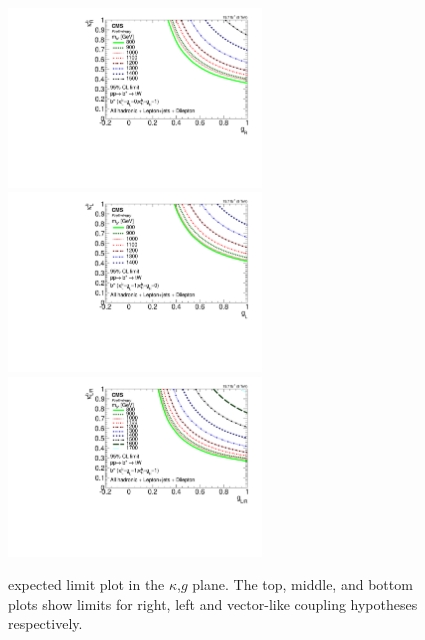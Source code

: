 \begin{figure}[htcb]
\centering
\includegraphics[width=0.6\textwidth]{AN-14-049/figs/bayesian_expected_hadronic_semileptonic_right_2Dlimit_plot.pdf}\\
\includegraphics[width=0.6\textwidth]{AN-14-049/figs/bayesian_expected_hadronic_semileptonic_left_2Dlimit_plot.pdf}\\
\includegraphics[width=0.6\textwidth]{AN-14-049/figs/bayesian_expected_hadronic_semileptonic_vector_2Dlimit_plot.pdf}\\
\caption{expected limit plot in the $\kappa$,$g$ plane.  The top, middle, and bottom plots show limits for right, left and vector-like coupling hypotheses respectively.}
\label{figs:bsthetalimit2dexp}
\end{figure}


